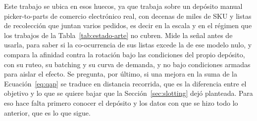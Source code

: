 Este trabajo se ubica en esos huecos, ya que trabaja sobre un depósito manual picker-to-parts de comercio electrónico real, con decenas de miles de SKU y listas de recolección que juntan varios pedidos, es decir en la escala y en el régimen que los trabajos de la Tabla~\ref{tab:estado-arte} no cubren.
Mide la señal antes de usarla, para saber si la co-ocurrencia de sus listas excede la de ese modelo nulo, y compara la afinidad contra la rotación bajo las condiciones del propio depósito, con su ruteo, su batching y su curva de demanda, y no bajo condiciones armadas para aislar el efecto.
Se pregunta, por último, si una mejora en la suma de la Ecuación~\ref{eq:qap} se traduce en distancia recorrida, que es la diferencia entre el objetivo y lo que se quiere bajar que la Sección~\ref{sec:slotting} dejó planteada.
Para eso hace falta primero conocer el depósito y los datos con que se hizo todo lo anterior, que es lo que sigue.
